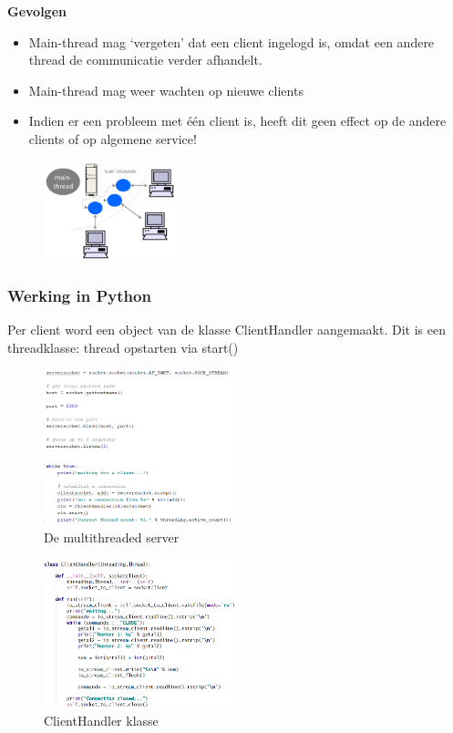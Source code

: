 \documentclass{article}
\begin{document}
\textbf{Gevolgen}

\begin{itemize}
    \item Main-thread mag `vergeten' dat een client ingelogd is, omdat een andere thread de communicatie verder afhandelt.
    \item Main-thread mag weer wachten op nieuwe clients
    \item Indien er een probleem met één client is, heeft dit geen effect op de andere clients of op algemene service!
\end{itemize}

\begin{figure}[H]
    \centering
    \includegraphics[width=0.35\textwidth]{multithreaded-server2.png}
\end{figure}

\subsubsection{Werking in Python}

Per client word een object van de klasse ClientHandler aangemaakt. 
Dit is een threadklasse: thread opstarten via start()

\begin{figure}[H]
    \centering
    \includegraphics[width=0.5\textwidth]{multithreaded-server-python.png}
    \caption{De multithreaded server}
\end{figure}

\begin{figure}[H]
    \centering
    \includegraphics[width=0.5\textwidth]{multithreaded-server-python2.png}
    \caption{ClientHandler klasse}
\end{figure}
\end{document}
